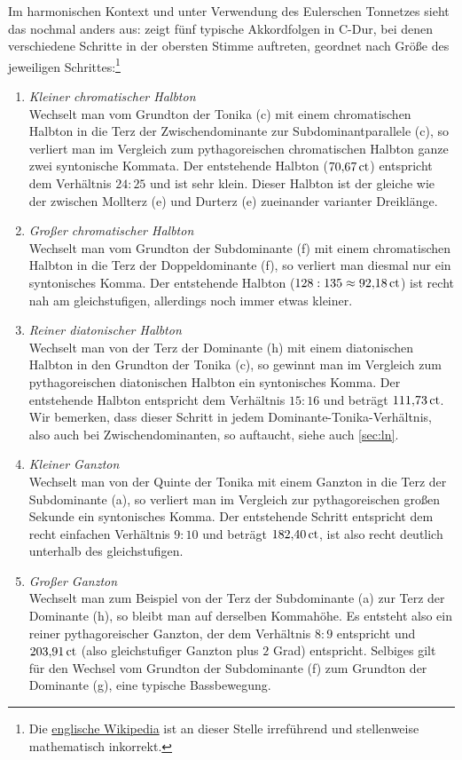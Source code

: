 Im harmonischen Kontext und unter Verwendung des Eulerschen Tonnetzes sieht das
nochmal anders aus:  zeigt fünf typische Akkordfolgen in C-Dur,
bei denen verschiedene Schritte in der obersten Stimme auftreten, geordnet nach
Größe des jeweiligen Schrittes:\footnote{Die
  \href{https://en.wikipedia.org/wiki/Semitone\#Just_intonation}{englische
    Wikipedia} ist an dieser Stelle irreführend und stellenweise mathematisch
  inkorrekt.}
\begin{enumerate}
\item \emph{Kleiner chromatischer Halbton}\\
  Wechselt man vom Grundton der Tonika (c) mit einem chromatischen Halbton in
  die Terz der Zwischendominante zur Subdominantparallele (\sharpmm c), so
  verliert man im Vergleich zum pythagoreischen chromatischen Halbton ganze zwei
  syntonische Kommata. Der entstehende Halbton ($70{,}67\,\text{ct}$) entspricht dem
  Verhältnis $24:25$ und ist sehr klein. Dieser Halbton ist der gleiche wie der
  zwischen Mollterz (\flatp e) und Durterz (\naturalm e) zueinander varianter
  Dreiklänge.
\item \emph{Großer chromatischer Halbton}\\
  Wechselt man vom Grundton der Subdominante (f) mit einem chromatischen Halbton
  in die Terz der Doppeldominante (\sharpm f), so verliert man diesmal nur ein
  syntonisches Komma.  Der entstehende Halbton ($128:135\approx 92{,}18\,\text{ct}$)
  ist recht nah am gleichstufigen, allerdings noch immer etwas
  kleiner.
\item \emph{Reiner diatonischer Halbton}\\
  Wechselt man von der Terz der Dominante (\naturalm h) mit einem diatonischen
  Halbton in den Grundton der Tonika (c), so gewinnt man im Vergleich zum
  pythagoreischen diatonischen Halbton ein syntonisches Komma.  Der entstehende
  Halbton entspricht dem Verhältnis $15:16$ und beträgt $111{,}73\,\text{ct}$.  Wir
  bemerken, dass dieser Schritt in jedem Dominante-Tonika-Verhältnis, also auch
  bei Zwischendominanten, so auftaucht, siehe auch \cref{sec:ln}.
\item \emph{Kleiner Ganzton}\\
  Wechselt man von der Quinte der Tonika mit einem Ganzton in die Terz der
  Subdominante (\naturalm a), so verliert man im Vergleich zur pythagoreischen
  großen Sekunde ein syntonisches Komma. Der entstehende Schritt entspricht dem
  recht einfachen Verhältnis \mbox{$9:10$} und beträgt $182{,}40\,\text{ct}$, ist also
  recht deutlich unterhalb des gleichstufigen.
\item \emph{Großer Ganzton}\\
  Wechselt man zum Beispiel von der Terz der Subdominante (\naturalm a) zur Terz
  der Dominante (\naturalm h), so bleibt man auf derselben Kommahöhe. Es
  entsteht also ein reiner pythagoreischer Ganzton, der dem Verhältnis $8:9$
  entspricht und $203{,}91\,\text{ct}$ (also gleichstufiger Ganzton plus $2$ Grad)
  entspricht.  Selbiges gilt für den Wechsel vom Grundton der Subdominante (f)
  zum Grundton der Dominante (g), eine typische Bassbewegung.
\end{enumerate}
